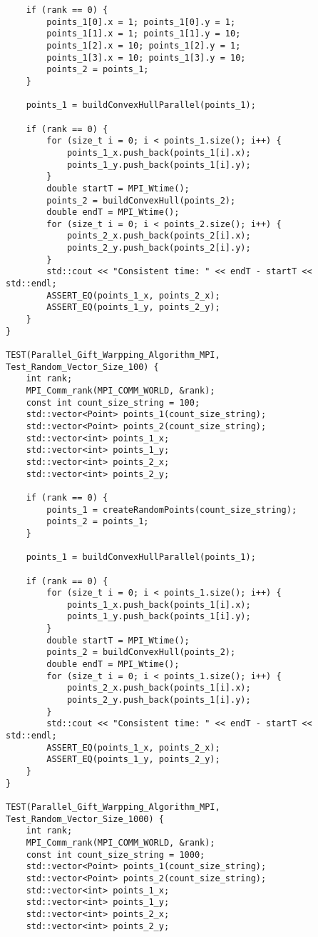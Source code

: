 \documentclass{report}
\begin{document}
\begin{lstlisting}
    if (rank == 0) {
        points_1[0].x = 1; points_1[0].y = 1;
        points_1[1].x = 1; points_1[1].y = 10;
        points_1[2].x = 10; points_1[2].y = 1;
        points_1[3].x = 10; points_1[3].y = 10;
        points_2 = points_1;
    }

    points_1 = buildConvexHullParallel(points_1);

    if (rank == 0) {
        for (size_t i = 0; i < points_1.size(); i++) {
            points_1_x.push_back(points_1[i].x);
            points_1_y.push_back(points_1[i].y);
        }
        double startT = MPI_Wtime();
        points_2 = buildConvexHull(points_2);
        double endT = MPI_Wtime();
        for (size_t i = 0; i < points_2.size(); i++) {
            points_2_x.push_back(points_2[i].x);
            points_2_y.push_back(points_2[i].y);
        }
        std::cout << "Consistent time: " << endT - startT << std::endl;
        ASSERT_EQ(points_1_x, points_2_x);
        ASSERT_EQ(points_1_y, points_2_y);
    }
}

TEST(Parallel_Gift_Warpping_Algorithm_MPI, Test_Random_Vector_Size_100) {
    int rank;
    MPI_Comm_rank(MPI_COMM_WORLD, &rank);
    const int count_size_string = 100;
    std::vector<Point> points_1(count_size_string);
    std::vector<Point> points_2(count_size_string);
    std::vector<int> points_1_x;
    std::vector<int> points_1_y;
    std::vector<int> points_2_x;
    std::vector<int> points_2_y;

    if (rank == 0) {
        points_1 = createRandomPoints(count_size_string);
        points_2 = points_1;
    }

    points_1 = buildConvexHullParallel(points_1);

    if (rank == 0) {
        for (size_t i = 0; i < points_1.size(); i++) {
            points_1_x.push_back(points_1[i].x);
            points_1_y.push_back(points_1[i].y);
        }
        double startT = MPI_Wtime();
        points_2 = buildConvexHull(points_2);
        double endT = MPI_Wtime();
        for (size_t i = 0; i < points_1.size(); i++) {
            points_2_x.push_back(points_1[i].x);
            points_2_y.push_back(points_1[i].y);
        }
        std::cout << "Consistent time: " << endT - startT << std::endl;
        ASSERT_EQ(points_1_x, points_2_x);
        ASSERT_EQ(points_1_y, points_2_y);
    }
}

TEST(Parallel_Gift_Warpping_Algorithm_MPI, Test_Random_Vector_Size_1000) {
    int rank;
    MPI_Comm_rank(MPI_COMM_WORLD, &rank);
    const int count_size_string = 1000;
    std::vector<Point> points_1(count_size_string);
    std::vector<Point> points_2(count_size_string);
    std::vector<int> points_1_x;
    std::vector<int> points_1_y;
    std::vector<int> points_2_x;
    std::vector<int> points_2_y;


\end{lstlisting}
\end{document}
